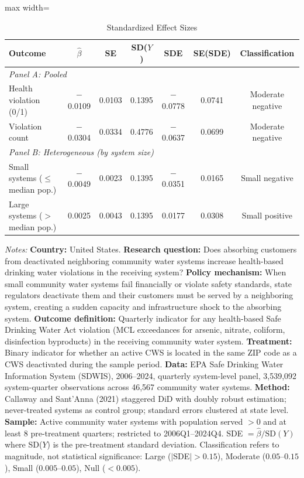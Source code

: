 \begin{table}[t]
\centering
\caption{Standardized Effect Sizes}
\label{tab:sde}
\begin{adjustbox}{max width=\textwidth}
\begin{tabular}{lcccccc}
\hline\hline
Outcome & $\hat{\beta}$ & SE & SD($Y$) & SDE & SE(SDE) & Classification \\
\hline
\multicolumn{7}{l}{\textit{Panel A: Pooled}} \\
Health violation (0/1) & $-$0.0109 & 0.0103 & 0.1395 & $-$0.0778 & 0.0741 & Moderate negative \\
Violation count & $-$0.0304 & 0.0334 & 0.4776 & $-$0.0637 & 0.0699 & Moderate negative \\
[0.5em]
\multicolumn{7}{l}{\textit{Panel B: Heterogeneous (by system size)}} \\
Small systems ($\leq$ median pop.) & $-$0.0049 & 0.0023 & 0.1395 & $-$0.0351 & 0.0165 & Small negative \\
Large systems ($>$ median pop.) & 0.0025 & 0.0043 & 0.1395 & 0.0177 & 0.0308 & Small positive \\
\hline\hline
\end{tabular}
\end{adjustbox}

\vspace{0.3em}
{\footnotesize \textit{Notes:}
\textbf{Country:} United States.
\textbf{Research question:} Does absorbing customers from deactivated neighboring community water systems increase health-based drinking water violations in the receiving system?
\textbf{Policy mechanism:} When small community water systems fail financially or violate safety standards, state regulators deactivate them and their customers must be served by a neighboring system, creating a sudden capacity and infrastructure shock to the absorbing system.
\textbf{Outcome definition:} Quarterly indicator for any health-based Safe Drinking Water Act violation (MCL exceedances for arsenic, nitrate, coliform, disinfection byproducts) in the receiving community water system.
\textbf{Treatment:} Binary indicator for whether an active CWS is located in the same ZIP code as a CWS deactivated during the sample period.
\textbf{Data:} EPA Safe Drinking Water Information System (SDWIS), 2006--2024, quarterly system-level panel, 3,539,092 system-quarter observations across 46,567 community water systems.
\textbf{Method:} Callaway and Sant'Anna (2021) staggered DiD with doubly robust estimation; never-treated systems as control group; standard errors clustered at state level.
\textbf{Sample:} Active community water systems with population served $> 0$ and at least 8 pre-treatment quarters; restricted to 2006Q1--2024Q4.
SDE $= \hat{\beta} / \text{SD}(Y)$ where SD($Y$) is the pre-treatment standard deviation.
Classification refers to magnitude, not statistical significance:
Large ($|$SDE$| > 0.15$), Moderate ($0.05$--$0.15$), Small ($0.005$--$0.05$), Null ($< 0.005$).}
\end{table}
